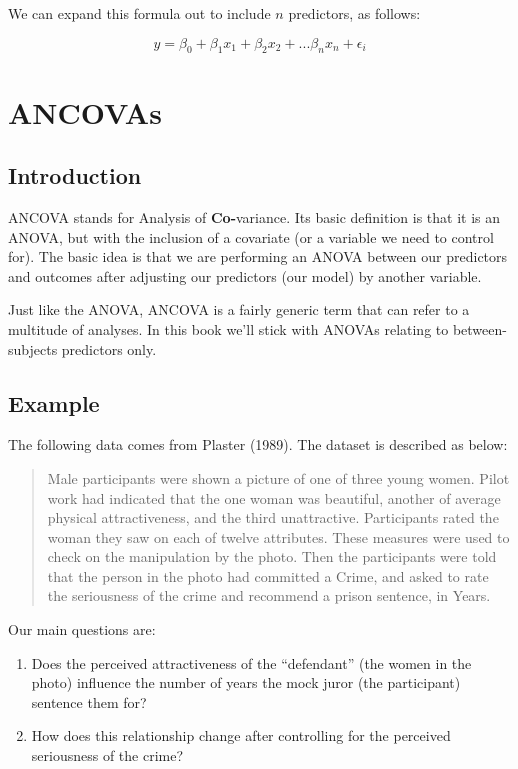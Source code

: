 \documentclass[
]{book}
\providecommand{\tightlist}{%
  \setlength{\itemsep}{0pt}\setlength{\parskip}{0pt}}
\begin{document}
We can expand this formula out to include \(n\) predictors, as follows:

\[
y = \beta_0 + \beta_1x_1 +\beta_2x_2 + ... \beta_nx_n + \epsilon_i
\]

\hypertarget{ancovas}{%
\section{ANCOVAs}\label{ancovas}}

\hypertarget{introduction-5}{%
\subsection{Introduction}\label{introduction-5}}

ANCOVA stands for Analysis of \textbf{Co-}variance. Its basic definition is that it is an ANOVA, but with the inclusion of a covariate (or a variable we need to control for). The basic idea is that we are performing an ANOVA between our predictors and outcomes after adjusting our predictors (our model) by another variable.

Just like the ANOVA, ANCOVA is a fairly generic term that can refer to a multitude of analyses. In this book we'll stick with ANOVAs relating to between-subjects predictors only.

\hypertarget{example-6}{%
\subsection{Example}\label{example-6}}

The following data comes from Plaster (1989). The dataset is described as below:

\begin{quote}
Male participants were shown a picture of one of three young women. Pilot work had indicated that the one woman was beautiful, another of average physical attractiveness, and the third unattractive. Participants rated the woman they saw on each of twelve attributes. These measures were used to check on the manipulation by the photo.
Then the participants were told that the person in the photo had committed a Crime, and asked to rate the seriousness of the crime and recommend a prison sentence, in Years.
\end{quote}

Our main questions are:

\begin{enumerate}
\def\labelenumi{\arabic{enumi}.}
\tightlist
\item
  Does the perceived attractiveness of the ``defendant'' (the women in the photo) influence the number of years the mock juror (the participant) sentence them for?
\item
  How does this relationship change after controlling for the perceived seriousness of the crime?
\end{enumerate}
\end{document}
